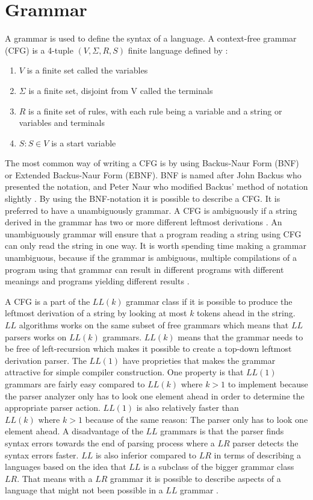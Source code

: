 \section{Grammar}
\label{sec:grammar}
A grammar is used to define the syntax of a language. A context-free grammar (CFG) is a 4-tuple $(V, \Sigma, R, S)$ finite language defined by \citep{sipser}:
\begin{enumerate}
	\item $V$ is a finite set called the variables
	\item $\Sigma$ is a finite set, disjoint from V called the terminals
	\item $R$ is a finite set of rules, with each rule being a variable and a string or variables and terminals
	\item $S: S \in V$ is a start variable
\end{enumerate}

The most common way of writing a CFG is by using Backus-Naur Form (BNF) or Extended Backus-Naur Form (EBNF). BNF is named after John Backus who presented the notation, and Peter Naur who modified Backus' method of notation slightly \citep{sebesta}. By using the BNF-notation it is possible to describe a CFG. It is preferred to have a unambiguously grammar. A CFG is ambiguously if a string derived in the grammar has two or more different leftmost derivations \citep{sipser}. An unambiguously grammar will ensure that a program reading a string using CFG can only read the string in one way. %
It is worth spending time making a grammar unambiguous, because if the grammar is ambiguous, multiple compilations of a program using that grammar can result in different programs with different meanings and programs yielding different results \citep{sebesta}. 

A CFG is a part of the $LL(k)$ grammar class if it is possible to produce the leftmost derivation of a string by looking at most $k$ tokens ahead in the string. $LL$ algorithms works on the same subset of free grammars which means that $LL$ parsers works on $LL(k)$ grammars. $LL(k)$ means that the grammar needs to be free of left-recursion which makes it possible to create a top-down leftmost derivation parser.
The $LL(1)$ have proprieties that makes the grammar attractive for simple compiler construction. One property is that $LL(1)$ grammars are fairly easy compared to $LL(k)\text{ where }k > 1$ to implement because the parser analyzer only has to look one element ahead in order to determine the appropriate parser action. $LL(1)$ is also relatively faster than $LL(k)\text{ where }k > 1$ because of the same reason: The parser only has to look one element ahead. A disadvantage of the $LL$ grammars is that the parser finds syntax errors towards the end of parsing process where a $LR$ parser detects the syntax errors faster. $LL$ is also inferior compared to $LR$ in terms of describing a languages based on the idea that $LL$ is a subclass of the bigger grammar class $LR$. That means with a $LR$ grammar it is possible to describe aspects of a language that might not been possible in a $LL$ grammar \citep{CraftingACompiler} \citep{sebesta}.

